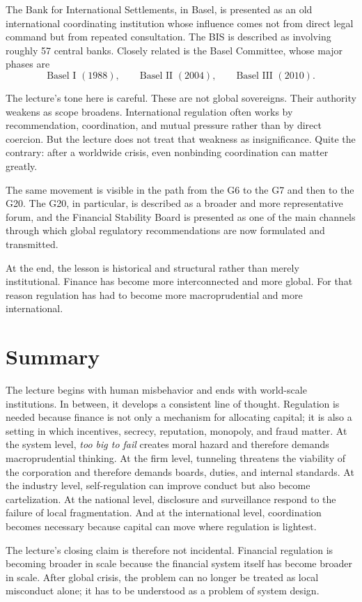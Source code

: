 The Bank for International Settlements, in Basel, is presented as an old international coordinating institution whose influence comes not from direct legal command but from repeated consultation. The BIS is described as involving roughly 57 central banks. Closely related is the Basel Committee, whose major phases are
\begin{equation}
\text{Basel I }(1988),\qquad \text{Basel II }(2004),\qquad \text{Basel III }(2010).
\end{equation}

The lecture's tone here is careful. These are not global sovereigns. Their authority weakens as scope broadens. International regulation often works by recommendation, coordination, and mutual pressure rather than by direct coercion. But the lecture does not treat that weakness as insignificance. Quite the contrary: after a worldwide crisis, even nonbinding coordination can matter greatly.

The same movement is visible in the path from the G6 to the G7 and then to the G20. The G20, in particular, is described as a broader and more representative forum, and the Financial Stability Board is presented as one of the main channels through which global regulatory recommendations are now formulated and transmitted.

At the end, the lesson is historical and structural rather than merely institutional. Finance has become more interconnected and more global. For that reason regulation has had to become more macroprudential and more international.

\section{Summary}

The lecture begins with human misbehavior and ends with world-scale institutions. In between, it develops a consistent line of thought. Regulation is needed because finance is not only a mechanism for allocating capital; it is also a setting in which incentives, secrecy, reputation, monopoly, and fraud matter. At the system level, \emph{too big to fail} creates moral hazard and therefore demands macroprudential thinking. At the firm level, tunneling threatens the viability of the corporation and therefore demands boards, duties, and internal standards. At the industry level, self-regulation can improve conduct but also become cartelization. At the national level, disclosure and surveillance respond to the failure of local fragmentation. And at the international level, coordination becomes necessary because capital can move where regulation is lightest.

The lecture's closing claim is therefore not incidental. Financial regulation is becoming broader in scale because the financial system itself has become broader in scale. After global crisis, the problem can no longer be treated as local misconduct alone; it has to be understood as a problem of system design.
